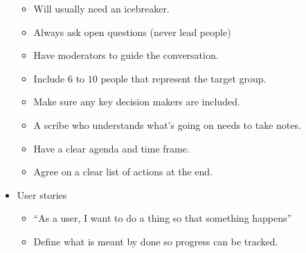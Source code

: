 \begin{itemize}
	      \begin{itemize}
		      \item Will usually need an icebreaker.
		      \item Always ask open questions (never lead people)
		      \item Have moderators to guide the conversation.
		      \item Include \(6\) to \(10\) people that represent the target group.
		      \item Make sure any key decision makers are included.
		      \item A scribe who understands what's going on needs to take notes.
		      \item Have a clear agenda and time frame.
		      \item Agree on a clear list of actions at the end.
	      \end{itemize}

	\item User stories

	      \begin{itemize}
		      \item ``As a user, I want to do a thing so that something happens''
		      \item Define what is meant by done so progress can be tracked.
	      \end{itemize}
\end{itemize}
